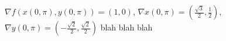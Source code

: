 {
$\nabla f(x(0,\pi),y(0,\pi)) = (1,0)$, $\nabla x(0,\pi) =(\frac{\sqrt{3}}{2},\frac{1}{2})$, $\nabla y(0,\pi) = (-\frac{\sqrt{2}}{2},\frac{\sqrt{2}}{2})$
}
{
blah blah blah
}
